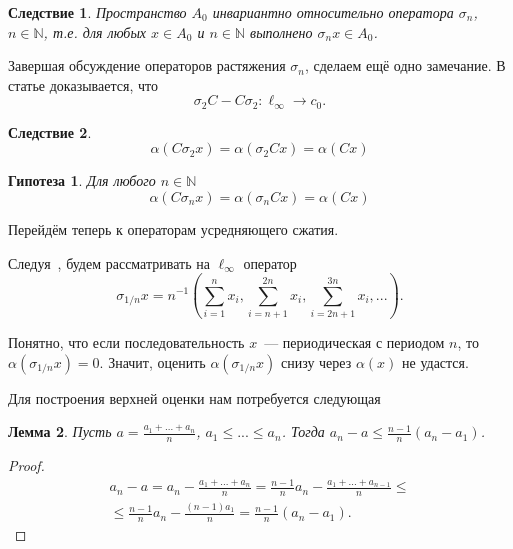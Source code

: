 \documentclass[a4paper,14pt]{article} %
\theoremstyle{plain}
\newtheorem{lemma}{Лемма}[section]
\newtheorem{corollary}{Следствие}[lemma]
\newtheorem{hypothesis}[lemma]{Гипотеза}
\begin{document}
\begin{corollary}
	Пространство $A_0$ инвариантно относительно оператора $\sigma_n$,
	$n\in\mathbb{N}$,
	т.е. для любых $x\in A_0$ и $n\in\mathbb{N}$ выполнено $\sigma_n x\in A_0$.
\end{corollary}

Завершая обсуждение операторов растяжения $\sigma_n$, сделаем ещё одно замечание.
В статье \cite[lemma 16]{Semenov2010invariant} доказывается, что
\begin{equation}
	\sigma_2 C - C \sigma_2 : \ell_\infty \to c_0
	.
\end{equation}

\begin{corollary}
	$$
		\alpha(C\sigma_2 x) =
		\alpha(\sigma_2 Cx) =
		\alpha(Cx)
	$$
\end{corollary}

\begin{hypothesis}
	Для любого $n\in\mathbb{N}$
	$$
		\alpha(C\sigma_n x) =
		\alpha(\sigma_n Cx) =
		\alpha(Cx)
	$$
\end{hypothesis}

Перейдём теперь к операторам усредняющего сжатия.

Следуя~\cite[p. 131, prop. 2.b.2]{lindenstrauss1979classical},
будем рассматривать на $\ell_\infty$ оператор
\begin{equation}
	\sigma_{1/n} x = n^{-1}
	\left(
		\sum_{i=1}^{n} x_i,
		\sum_{i=n+1}^{2n} x_i,
		\sum_{i=2n+1}^{3n} x_i,
		...
	\right).
\end{equation}

Понятно, что если последовательность $x$~--- периодическая с периодом $n$,
то $\alpha(\sigma_{1/n}x)=0$.
Значит, оценить $\alpha(\sigma_{1/n}x)$ снизу через $\alpha(x)$ не удастся.

Для построения верхней оценки нам потребуется следующая

\begin{lemma}
	\label{thm:distance_from_average}
	Пусть $a=\frac{a_1+...+a_n}{n}$, $a_1 \leq ... \leq a_n$.
	Тогда $a_n - a \leq \frac{n-1}{n} (a_n - a_1)$.
\end{lemma}

\begin{proof}
	\begin{multline}
		a_n - a = a_n - \frac{a_1+...+a_n}{n}
		=
		\frac{n-1}{n}a_n - \frac{a_1+...+a_{n-1}}{n}
		\leq
		\\\leq
		\frac{n-1}{n}a_n - \frac{(n-1)a_1}{n}
		=
		\frac{n-1}{n}(a_n - a_1)
		.
	\end{multline}
\end{proof}
\end{document}
